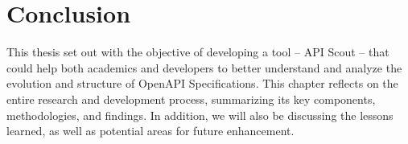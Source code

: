 \chapter{Conclusion}\label{ch:conclusion}
This thesis set out with the objective of developing a tool -- API Scout -- that could help both academics and developers to better understand and analyze the evolution and structure of OpenAPI Specifications.
This chapter reflects on the entire research and development process, summarizing its key components, methodologies, and findings.
In addition, we will also be discussing the lessons learned, as well as potential areas for future enhancement.





